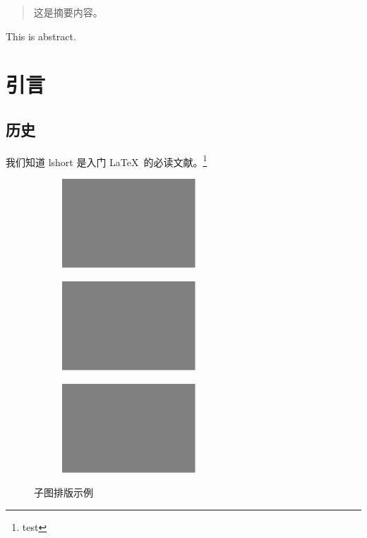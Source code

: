 \documentclass[newenv,final]{ncuthesis}
\begin{document}
\maketitle
\frontmatter
\makedecaut
\begin{abstract}
这是摘要内容。
\end{abstract}
\begin{abstract*}
This is abstract.
\end{abstract*}
\tableofcontents
\mainmatter
\chapter{引言}
\section{历史}
我们知道 lshort\cite{lshortcn} 是入门 \LaTeX\ 的必读文献。\footnote{test}

\begin{figure}[htb]
\centering
\begin{subfigure}{.45\textwidth}
\centering
\includegraphics[width=5cm]{figures/test.pdf}
\label{fig:subfigexp-a}
\end{subfigure}
\begin{subfigure}{.45\textwidth}
\centering
\includegraphics[width=5cm]{figures/test.pdf}
\label{fig:subfigexp-b}
\end{subfigure}
\begin{subfigure}{.45\textwidth}
\centering
\includegraphics[width=5cm]{figures/test.pdf}
\label{fig:subfigexp-c}
\end{subfigure}
\caption{子图排版示例}
\label{fig:subfig}
\end{figure}
\end{document}
